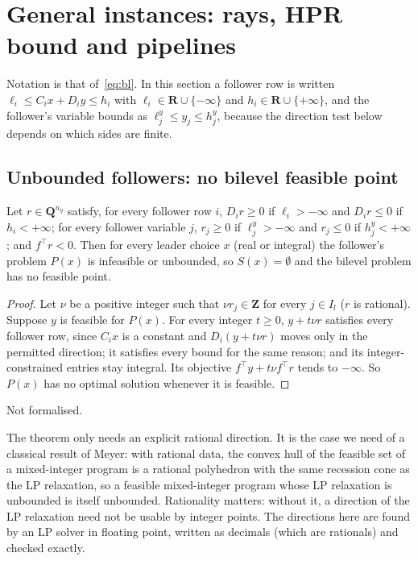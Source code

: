 \section{General instances: rays, HPR bound and pipelines}\label{app:general}

Notation is that of~\eqref{eq:bl}. In this section a follower row is written
$\ell_i\le C_ix+D_iy\le h_i$ with $\ell_i\in\mathbf{R}\cup\{-\infty\}$ and
$h_i\in\mathbf{R}\cup\{+\infty\}$, and the follower's variable bounds as
$\ell^y_j\le y_j\le h^y_j$, because the direction test below depends on which
sides are finite.

\subsection{Unbounded followers: no bilevel feasible point}

\begin{theorem}\label{thm:ray}
Let $r\in\mathbf{Q}^{n_y}$ satisfy, for every follower row $i$, $D_ir\ge 0$ if
$\ell_i>-\infty$ and $D_ir\le 0$ if $h_i<+\infty$; for every follower variable
$j$, $r_j\ge 0$ if $\ell^y_j>-\infty$ and $r_j\le 0$ if $h^y_j<+\infty$; and
$f^{\top}r<0$. Then for every leader choice $x$ (real or integral) the
follower's problem $P(x)$ is infeasible or unbounded, so $S(x)=\emptyset$ and
the bilevel problem has no feasible point.
\end{theorem}
\begin{proof}
Let $\nu$ be a positive integer such that $\nu r_j\in\mathbf{Z}$ for every $j\in I_l$
($r$ is rational). Suppose $y$ is feasible for $P(x)$. For every integer
$t\ge 0$, $y+t\nu r$ satisfies every follower row, since $C_ix$ is a constant
and $D_i(y+t\nu r)$ moves only in the permitted direction; it satisfies every
bound for the same reason; and its integer-constrained entries stay integral.
Its objective $f^{\top}y+t\nu f^{\top}r$ tends to $-\infty$. So $P(x)$ has no
optimal solution whenever it is feasible.
\end{proof}
\noindent Not formalised.

\begin{remark}
The theorem only needs an explicit rational direction. It is the case we
need of a classical result of Meyer:\cite{meyer1974existence} with rational data, the convex hull of the feasible set
of a mixed-integer program is a rational polyhedron with the same recession
cone as the LP relaxation, so a feasible mixed-integer program whose LP
relaxation is unbounded is itself unbounded. Rationality matters: without it,
a direction of the LP relaxation need not be usable by integer points. The
directions here are found by an LP solver in floating point, written as
decimals (which are rationals) and checked exactly.
\end{remark}

